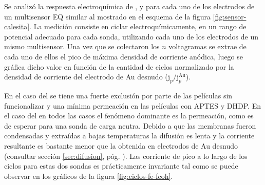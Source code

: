 		Se analizó la respuesta electroquímica de \aminorutenio, \ferroferri\space y \ferroceno\space para cada uno de los electrodos de un multisensor EQ similar al mostrado en el esquema de la figura \ref{fig:sensor-calesita}. La medición consiste en ciclar electroquímicamente, en un rango de potencial adecuado para cada sonda, utilizando cada uno de los electrodos de un mismo multisensor. Una vez que se colectaron los $n$ voltagramas se extrae de cada uno de ellos el pico de máxima densidad de corriente anódica, luego se gráfica dicho valor en función de la cantidad de ciclos normalizado por la densidad de corriente del electrodo de Au desnudo ($\text{j}_p/\text{j}_p^\text{Au}$).
		
		En el caso del \fe\space se tiene una fuerte exclusión por parte de las películas sin funcionalizar y una mínima permeación en las películas con APTES y DHDP. 
		En el caso del \fc\space en todos las casos el fenómeno dominante es la permeación, como es de esperar para una sonda de carga neutra. Debido a que las membranas fueron condensadas y extraídas a bajas temperaturas la difusión es lenta y la corriente resultante es bastante menor que la obtenida en electrodos de Au desnudo (consultar sección \ref{sec:difusion}, pág. \pageref{sec:difusion}). Las corriente de pico a lo largo de los ciclos para estas dos sondas es prácticamente invariante tal como se puede observar en los gráficos de la figura \ref{fig:ciclos-fe-fcoh}.

